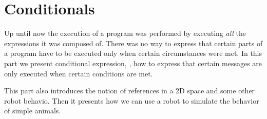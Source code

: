 \part{Conditionals}
Up until now the execution of a  program was performed by executing \emph{all} the expressions it was composed of. There was no way to express that certain parts of a program have to be executed only when certain circumstances were met. In this part we present conditional expression, \ie, how to express that certain messages are only executed when certain conditions are met. 

This part also introduces the notion of references in a 2D space and some other robot behavio. Then it presents how we can use a robot to simulate the behavior of simple animals. 
